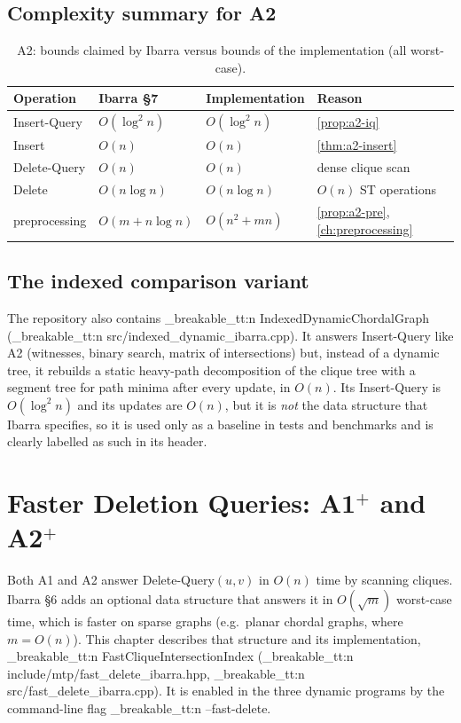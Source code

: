\documentclass[11pt,a4paper,oneside]{report}
\theoremstyle{plain}
\theoremstyle{definition}
\theoremstyle{remark}
\newcommand{\op}[1]{\textsf{#1}}
\DeclareRobustCommand{\code}[1]{\mtp_breakable_tt:n {#1}}
\DeclareRobustCommand{\file}[1]{\mtp_breakable_tt:n {#1}}
\begin{document}
\section{Complexity summary for A2}
\begin{table}[ht]
\centering\small
\caption[A2: claimed versus implemented bounds]{A2: bounds claimed by Ibarra versus bounds of
the implementation (all worst-case).}\label{tab:a2-summary}
\begin{tabular}{@{}llll@{}}
\toprule
\textbf{Operation} & \textbf{Ibarra \S7} & \textbf{Implementation} & \textbf{Reason}\\
\midrule
\op{Insert-Query} & \(O(\log^2 n)\) & \(O(\log^2 n)\) & \cref{prop:a2-iq}\\
\op{Insert} & \(O(n)\) & \(O(n)\) & \cref{thm:a2-insert}\\
\op{Delete-Query} & \(O(n)\) & \(O(n)\) & dense clique scan\\
\op{Delete} & \(O(n\log n)\) & \(O(n\log n)\) & \(O(n)\) ST operations\\
preprocessing & \(O(m+n\log n)\) & \(O(n^2+mn)\) & \cref{prop:a2-pre}, \cref{ch:preprocessing}\\
\bottomrule
\end{tabular}
\end{table}

\section{The indexed comparison variant}\label{sec:indexed}
The repository also contains \code{IndexedDynamicChordalGraph}
(\file{src/indexed_dynamic_ibarra.cpp}). It answers \op{Insert-Query} like A2 (witnesses,
binary search, matrix of intersections) but, instead of a dynamic tree, it rebuilds a static
heavy-path decomposition of the clique tree with a segment tree for path minima after every
update, in \(O(n)\). Its \op{Insert-Query} is \(O(\log^2 n)\) and its updates are \(O(n)\), but
it is \emph{not} the data structure that Ibarra specifies, so it is used only as a baseline in
tests and benchmarks and is clearly labelled as such in its header.
\chapter{Faster Deletion Queries: A1\texorpdfstring{\(^+\)}{+} and A2\texorpdfstring{\(^+\)}{+}}\label{ch:fastdelete}
Both A1 and A2 answer \op{Delete-Query}\((u,v)\) in \(O(n)\) time by scanning cliques. Ibarra
\S6 adds an optional data structure that answers it in \(O(\sqrt m)\) worst-case time, which is
faster on sparse graphs (e.g.\ planar chordal graphs, where \(m=O(n)\)). This chapter describes
that structure and its implementation, \code{FastCliqueIntersectionIndex}
(\file{include/mtp/fast_delete_ibarra.hpp}, \file{src/fast_delete_ibarra.cpp}). It is enabled
in the three dynamic programs by the command-line flag \code{--fast-delete}.
\end{document}
